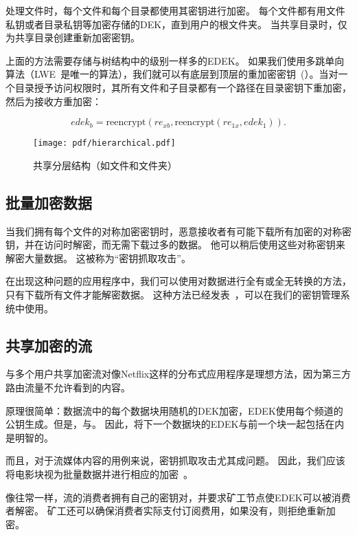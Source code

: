 \documentclass[longbibliography,nofootinbib]{revtex4-1}
\newcommand{\kms}{NuCypher KMS}
\begin{document}
\begin{CJK*}{UTF8}{gbsn}
	处理文件时，每个文件和每个目录都使用其密钥进行加密。 每个文件都有用文件私钥或者目录私钥等加密存储的DEK，直到用户的根文件夹。 当共享目录时，仅为共享目录创建重新加密密钥。
    
    上面的方法需要存储与树结构中的级别一样多的EDEK。 如果我们使用多跳单向算法（LWE~\cite{lwe-reencryption}是唯一的算法），我们就可以有底层到顶层的重加密密钥~(）。当对一个目录授予访问权限时，其所有文件和子目录都有一个路径在目录密钥下重加密，然后为接收方重加密：

\begin{equation}
    edek_b = \text{reencrypt}(re_{xb}, \text{reencrypt}(re_{1x}, edek_1)).
\end{equation}
\begin{figure}
\centering
    \texttt{[image: pdf/hierarchical.pdf]}
    \caption{共享分层结构（如文件和文件夹）}
    \label{fig:hierarchical-pre}
\end{figure}

\subsection{批量加密数据}

	当我们拥有每个文件的对称加密密钥时，恶意接收者有可能下载所有加密的对称密钥，并在访问时解密，而无需下载过多的数据。 他可以稍后使用这些对称密钥来解密大量数据。 这被称为“密钥抓取攻击”。
    
    在出现这种问题的应用程序中，我们可以使用对数据进行全有或全无转换的方法，只有下载所有文件才能解密数据。 这种方法已经发表~\cite{aont-bulk}，可以在我们的密钥管理系统中使用。

\subsection{共享加密的流}

与多个用户共享加密流对像Netflix这样的分布式应用程序是理想方法，因为第三方路由流量不允许看到的内容。

    原理很简单：数据流中的每个数据块用随机的DEK加密，EDEK使用每个频道的公钥生成。但是，与。 因此，将下一个数据块的EDEK与前一个块一起包括在内是明智的。
    
    而且，对于流媒体内容的用例来说，密钥抓取攻击尤其成问题。 因此，我们应该将电影块视为批量数据并进行相应的加密~\cite{aont-bulk}。
    
    像往常一样，流的消费者拥有自己的密钥对，并要求矿工节点使EDEK可以被消费者解密。 矿工还可以确保消费者实际支付订阅费用，如果没有，则拒绝重新加密。



\end{CJK*}
\end{document}

